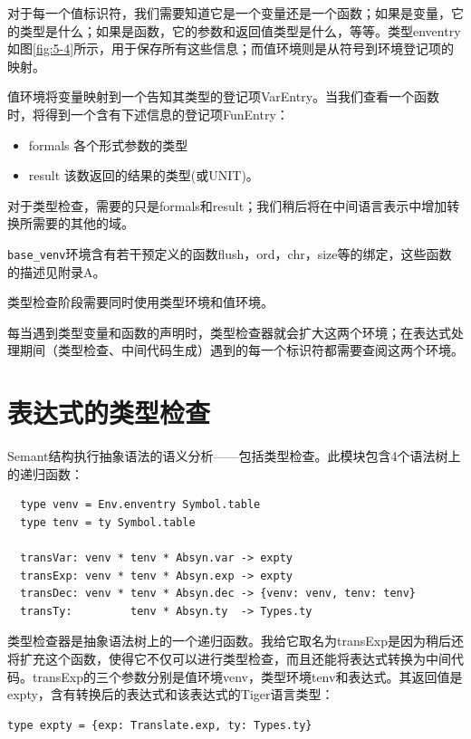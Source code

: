 \documentclass[cn,11pt,chinese]{elegantbook}
\begin{document}
对于每一个值标识符，我们需要知道它是一个变量还是一个函数；如果是变量，它的类型是什么；如果是函数，它的参数和返回值类型是什么，等等。类型enventry如图\ref{fig:5-4}所示，用于保存所有这些信息；而值环境则是从符号到环境登记项的映射。

值环境将变量映射到一个告知其类型的登记项VarEntry。当我们查看一个函数时，将得到一个含有下述信息的登记项FunEntry：

\begin{itemize}
  \item formals 各个形式参数的类型
  \item result 该数返回的结果的类型(或UNIT)。
\end{itemize}

对于类型检查，需要的只是formals和result；我们稍后将在中间语言表示中增加转换所需要的其他的域。

\lstinline{base_venv}环境含有若干预定义的函数flush，ord，chr，size等的绑定，这些函数的描述见附录A。

类型检查阶段需要同时使用类型环境和值环境。

每当遇到类型变量和函数的声明时，类型检查器就会扩大这两个环境；在表达式处理期间（类型检查、中间代码生成）遇到的每一个标识符都需要查阅这两个环境。

\section{表达式的类型检查}

Semant结构执行抽象语法的语义分析——包括类型检查。此模块包含4个语法树上的递归函数：

\begin{lstlisting}
  type venv = Env.enventry Symbol.table
  type tenv = ty Symbol.table

  transVar: venv * tenv * Absyn.var -> expty
  transExp: venv * tenv * Absyn.exp -> expty
  transDec: venv * tenv * Absyn.dec -> {venv: venv, tenv: tenv}
  transTy:         tenv * Absyn.ty  -> Types.ty
\end{lstlisting}

类型检查器是抽象语法树上的一个递归函数。我给它取名为transExp是因为稍后还将扩充这个函数，使得它不仅可以进行类型检查，而且还能将表达式转换为中间代码。transExp的三个参数分别是值环境venv，类型环境tenv和表达式。其返回值是expty，含有转换后的表达式和该表达式的Tiger语言类型：

\begin{lstlisting}
type expty = {exp: Translate.exp, ty: Types.ty}
\end{lstlisting}
\end{document}
